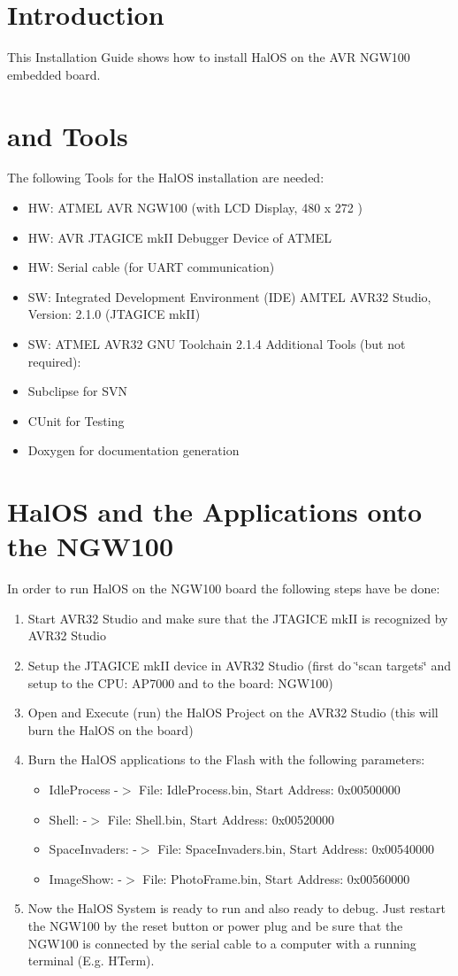 \hypertarget{index_intro}{}\section{Introduction}\label{index_intro}
This Installation Guide shows how to install HalOS on the AVR NGW100 embedded board.\hypertarget{installation_Hardware}{}\section{and Tools}\label{installation_Hardware}
The following Tools for the HalOS installation are needed: \begin{itemize}
\item HW: ATMEL AVR NGW100 (with LCD Display, 480 x 272 ) \item HW: AVR JTAGICE mkII Debugger Device of ATMEL \item HW: Serial cable (for UART communication) \item SW: Integrated Development Environment (IDE) AMTEL AVR32 Studio, Version: 2.1.0 (JTAGICE mkII) \item SW: ATMEL AVR32 GNU Toolchain 2.1.4 Additional Tools (but not required): \item Subclipse for SVN \item CUnit for Testing \item Doxygen for documentation generation\end{itemize}
\hypertarget{installation_Bring}{}\section{HalOS and the Applications onto the NGW100}\label{installation_Bring}
In order to run HalOS on the NGW100 board the following steps have be done:\begin{enumerate}
\item Start AVR32 Studio and make sure that the JTAGICE mkII is recognized by AVR32 Studio\item Setup the JTAGICE mkII device in AVR32 Studio (first do \char`\"{}scan targets\char`\"{} and setup to the CPU: AP7000 and to the board: NGW100)\item Open and Execute (run) the HalOS Project on the AVR32 Studio (this will burn the HalOS on the board)\item Burn the HalOS applications to the Flash with the following parameters: \begin{itemize}
\item IdleProcess -$>$ File: IdleProcess.bin, Start Address: 0x00500000 \item Shell: -$>$ File: Shell.bin, Start Address: 0x00520000 \item SpaceInvaders: -$>$ File: SpaceInvaders.bin, Start Address: 0x00540000 \item ImageShow: -$>$ File: PhotoFrame.bin, Start Address: 0x00560000\end{itemize}
\item Now the HalOS System is ready to run and also ready to debug. Just restart the NGW100 by the reset button or power plug and be sure that the NGW100 is connected by the serial cable to a computer with a running terminal (E.g. HTerm).\end{enumerate}
